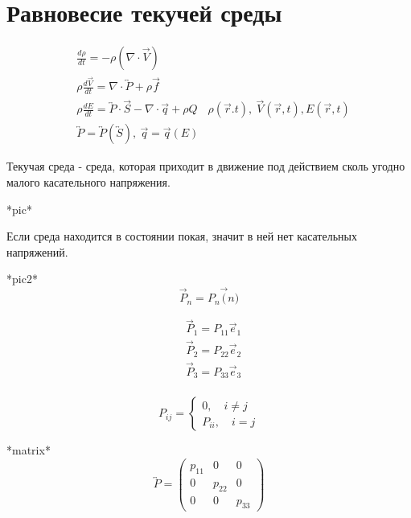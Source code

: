 \section{Равновесие текучей среды}
\begin{align*}
  &\frac{d\rho}{dt} = -\rho(\nabla \cdot \vec{V}) \\
  &\rho \frac{d \vec{V}}{dt} = \nabla \cdot \overleftrightarrow{P} + \rho \vec{f} \\
  & \rho \frac{d E}{dt} = \overleftrightarrow{P} \cdot \vec{S} - \nabla \cdot \vec{q} + \rho Q
  &\rho(\vec{r}. t),\ \vec{V}(\vec{r}, t), E(\vec{r}, t)\\ 
  &\overleftrightarrow{P} = \overleftrightarrow{P} (\overleftrightarrow{S}),\ \vec{q} = \vec{q}(E)
\end{align*}

\begin{defn}
  Текучая среда - среда, которая приходит в движение под действием сколь
  угодно малого касательного напряжения.
\end{defn}

*pic*

\begin{note}
  Если среда находится в состоянии покая, значит в ней нет касательных напряжений.
\end{note}

*pic2*
\[
  \vec{P}_n = P_n \vec(n)
\]

\begin{align*}
  &\vec{P}_1 = P_{11} \vec{e}_1 \\
  &\vec{P}_2 = P_{22} \vec{e}_2 \\
  &\vec{P}_3 = P_{33} \vec{e}_3 \\
\end{align*}

\[
  P_{ij} = \begin{cases}
    0, \quad i \neq j \\
    P_{ii}, \quad i = j
  \end{cases}
\]

*matrix*
\[
  \overleftrightarrow{P} =
  \begin{pmatrix}
    p_{11} &0 &0 \\
    0 &p_{22} &0 \\
    0 &0 &p_{33}
  \end{pmatrix}
\]

